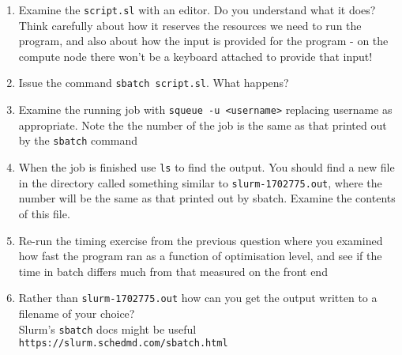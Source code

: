 \documentclass[a4paper, 12pt]{article}
\def \cc   {\tt }               %
\begin{document}
\begin{enumerate}
  
  \item Examine the {\cc script.sl} with an editor. Do you understand what it does? Think carefully about how it reserves the
     resources we need to run the program, and also about how the input is provided for the program - on the compute node there won't be a keyboard attached to provide that input!
  
  \item Issue the command {\cc sbatch script.sl}. What happens?

  \item Examine the running job with {\cc squeue -u <username>} replacing username as appropriate. Note the the number of the job is the same as that printed out by the {\cc sbatch} command

  \item When the job is finished use {\cc ls} to find the output. You should find a new file in the directory called something
     similar to {\cc slurm-1702775.out}, where the number will be the same as that printed out by sbatch. Examine the contents of this file.

  \item Re-run the timing exercise from the previous question where you examined how fast the program ran
     as a function of optimisation level, and see if the time in batch differs much from that measured on the front end

  \item Rather than {\cc slurm-1702775.out} how can you get the output written to a filename of your choice? \\
  Slurm's {\cc sbatch} docs might be useful {\cc https://slurm.schedmd.com/sbatch.html}

\end{enumerate}

\end{document}
